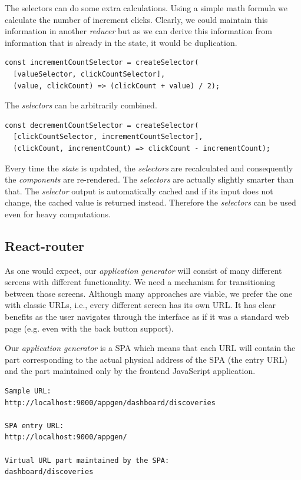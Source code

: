 The selectors can do some extra calculations. Using a simple math formula we calculate the number of increment clicks. Clearly, we could maintain this information in another \emph{reducer} but as we can derive this information from information that is already in the state, it would be duplication.

\begin{verbatim}
const incrementCountSelector = createSelector(
  [valueSelector, clickCountSelector],
  (value, clickCount) => (clickCount + value) / 2);
\end{verbatim}

The \emph{selectors} can be arbitrarily combined.

\begin{verbatim}
const decrementCountSelector = createSelector(
  [clickCountSelector, incrementCountSelector],
  (clickCount, incrementCount) => clickCount - incrementCount);
\end{verbatim}

Every time the \emph{state} is updated, the \emph{selectors} are recalculated and consequently the \emph{components} are re-rendered. The \emph{selectors} are actually slightly smarter than that. The \emph{selector} output is automatically cached and if its input does not change, the cached value is returned instead. Therefore the \emph{selectors} can be used even for heavy computations.

\subsection{React-router}

As one would expect, our \emph{application generator} will consist of many different screens with different functionality. We need a mechanism for transitioning between those screens. Although many approaches are viable, we prefer the one with classic URLs, i.e., every different screen has its own URL. It has clear benefits as the user navigates through the interface as if it was a standard web page (e.g. even with the back button support).

Our \emph{application generator} is a SPA which means that each URL will contain the part corresponding to the actual physical address of the SPA (the entry URL) and the part maintained only by the frontend JavaScript application.

\begin{verbatim}
Sample URL: 
http://localhost:9000/appgen/dashboard/discoveries

SPA entry URL: 
http://localhost:9000/appgen/

Virtual URL part maintained by the SPA: 
dashboard/discoveries
\end{verbatim}

